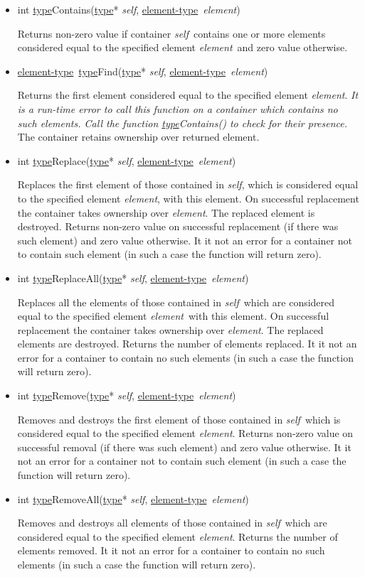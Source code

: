 \documentclass[a4paper]{article}
\newcommand{\st}{\underline{type}}
\newcommand{\et}{\underline{element-type}}
\newcommand{\sv}{\emph{self}}
\newcommand{\ev}{\emph{element}}
\newcommand{\meth}[1]{#1}
\begin{document}
\begin{itemize}
\item \meth{int \st Contains(\st* \sv, \et\ \ev)}


Returns non-zero value if container \sv\ contains one or more elements considered equal to the specified element \ev\ and zero value otherwise.


\item \meth{\et\ \st Find(\st* \sv, \et\ \ev)}


Returns the first element considered equal to the specified element \ev.
\emph{It is a run-time error to call this function on a container which contains no such elements. Call the function \meth{\st Contains()} to check for their presence.}
The container retains ownership over returned element.


\item \meth{int \st Replace(\st* \sv, \et\ \ev)}


Replaces the first element of those contained in \sv, which is considered equal to the specified element \ev, with this element.
On successful replacement the container takes ownership over \ev.
The replaced element is destroyed.
Returns non-zero value on successful replacement (if there was such element) and zero value otherwise.
It it not an error for a container not to contain such element (in such a case the function will return zero).


\item \meth{int \st ReplaceAll(\st* \sv, \et\ \ev)}


Replaces all the elements of those contained in \sv\ which are considered equal to the specified element \ev\ with this element.
On successful replacement the container takes ownership over \ev.
The replaced elements are destroyed.
Returns the number of elements replaced.
It it not an error for a container to contain no such elements (in such a case the function will return zero).


\item \meth{int \st Remove(\st* \sv, \et\ \ev)}


Removes and destroys the first element of those contained in \sv\ which is considered equal to the specified element \ev.
Returns non-zero value on successful removal (if there was such element) and zero value otherwise.
It it not an error for a container not to contain such element (in such a case the function will return zero).


\item \meth{int \st RemoveAll(\st* \sv, \et\ \ev)}


Removes and destroys all elements of those contained in \sv\ which are considered equal to the specified element \ev.
Returns the number of elements removed.
It it not an error for a container to contain no such elements (in such a case the function will return zero).


\end{itemize}
\end{document}
